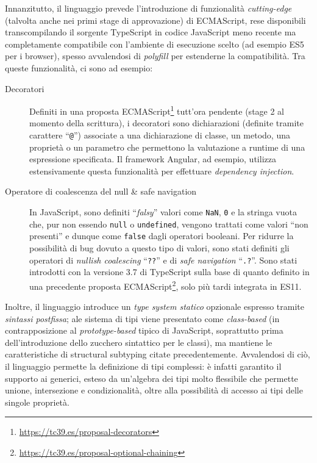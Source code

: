       Innanzitutto, il linguaggio prevede l'introduzione di funzionalità \emph{cutting-edge} (talvolta anche nei primi stage di approvazione) di ECMAScript,
      rese disponibili transcompilando il sorgente TypeScript in codice JavaScript meno recente ma completamente compatibile con l'ambiente di esecuzione scelto
      (ad esempio ES5 per i browser), spesso avvalendosi di \emph{polyfill} per estenderne la compatibilità.
      Tra queste funzionalità, ci sono ad esempio:

      \begin{description}
        \item[Decoratori]
          Definiti in una proposta ECMAScript\footnote{\url{https://tc39.es/proposal-decorators}} tutt'ora pendente (stage 2 al momento della scrittura),
          i decoratori sono dichiarazioni (definite tramite carattere ``\texttt{@}'') associate a una dichiarazione di classe, un metodo, una proprietà o un parametro che permettono la valutazione a runtime di una espressione specificata.
          Il framework Angular, ad esempio, utilizza estensivamente questa funzionalità per effettuare \emph{dependency injection}.

        \item[Operatore di coalescenza del null \& safe navigation]
          In JavaScript, sono definiti ``\emph{falsy}'' valori come \texttt{NaN}, \texttt{0} e la stringa vuota che, pur non essendo \texttt{null} o \texttt{undefined},
          vengono trattati come valori ``non presenti'' e dunque come \texttt{false} dagli operatori booleani.
          Per ridurre la possibilità di bug dovuto a questo tipo di valori, sono stati definiti gli operatori di \emph{nullish coalescing} ``\texttt{??}'' e di \emph{safe navigation} ``\texttt{.?}''.
          Sono stati introdotti con la versione 3.7 di TypeScript sulla base di quanto definito in una precedente proposta ECMAScript\footnote{\url{https://tc39.es/proposal-optional-chaining}}, solo più tardi integrata in ES11.
      \end{description}

      Inoltre, il linguaggio introduce un \emph{type system statico} opzionale espresso tramite \emph{sintassi postfissa};
      ale sistema di tipi viene presentato come \emph{class-based} (in contrapposizione al \emph{prototype-based} tipico di JavaScript, soprattutto prima dell'introduzione dello zucchero sintattico per le classi), ma mantiene le caratteristiche di structural subtyping citate precedentemente.
      Avvalendosi di ciò, il linguaggio permette la definizione di tipi complessi:
      è infatti garantito il supporto ai generici, esteso da un'algebra dei tipi molto flessibile che permette unione, intersezione e condizionalità, oltre alla possibilità di accesso ai tipi delle singole proprietà.

